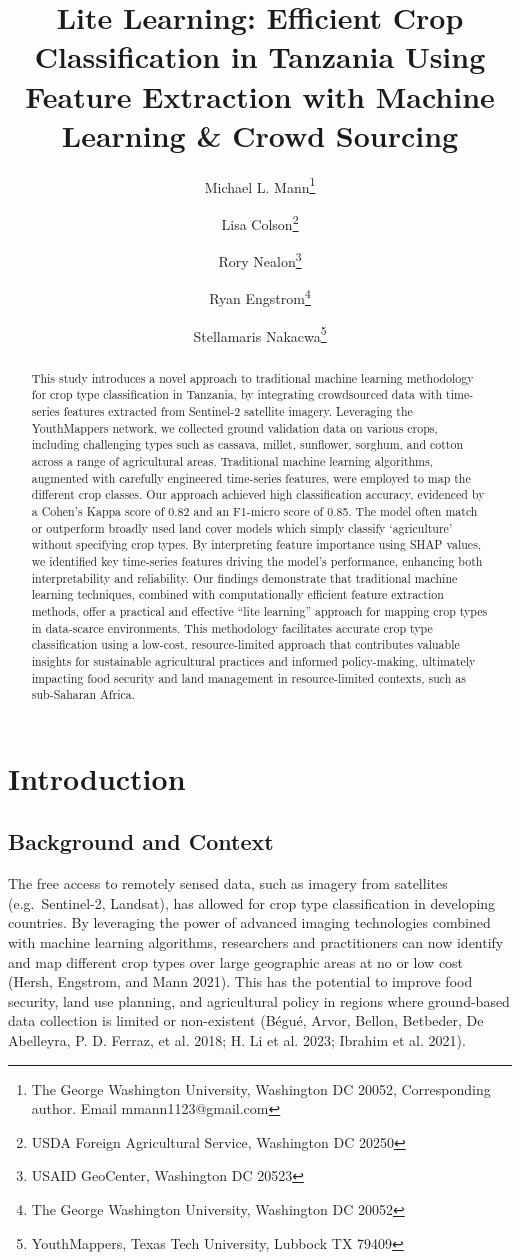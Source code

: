 \documentclass[
  journal,
  twocolumn]{IEEEtran}
\title{Lite Learning: Efficient Crop Classification in Tanzania Using
Feature Extraction with Machine Learning \& Crowd Sourcing}
\author{
Michael L. Mann\thanks{The George Washington University, Washington DC
20052, Corresponding author. Email mmann1123@gmail.com} \and 
Lisa Colson\thanks{USDA Foreign Agricultural Service, Washington DC
20250} \and 
Rory Nealon\thanks{USAID GeoCenter, Washington DC 20523} \and 
Ryan Engstrom\thanks{The George Washington University, Washington DC
20052} \and 
Stellamaris Nakacwa\thanks{YouthMappers, Texas Tech University, Lubbock
TX 79409}}
\date{}
\begin{document}
\maketitle
\begin{abstract}
This study introduces a novel approach to traditional machine learning
methodology for crop type classification in Tanzania, by integrating
crowdsourced data with time-series features extracted from Sentinel-2
satellite imagery. Leveraging the YouthMappers network, we collected
ground validation data on various crops, including challenging types
such as cassava, millet, sunflower, sorghum, and cotton across a range
of agricultural areas. Traditional machine learning algorithms,
augmented with carefully engineered time-series features, were employed
to map the different crop classes. Our approach achieved high
classification accuracy, evidenced by a Cohen's Kappa score of 0.82 and
an F1-micro score of 0.85. The model often match or outperform broadly
used land cover models which simply classify `agriculture' without
specifying crop types. By interpreting feature importance using SHAP
values, we identified key time-series features driving the model's
performance, enhancing both interpretability and reliability. Our
findings demonstrate that traditional machine learning techniques,
combined with computationally efficient feature extraction methods,
offer a practical and effective ``lite learning'' approach for mapping
crop types in data-scarce environments. This methodology facilitates
accurate crop type classification using a low-cost, resource-limited
approach that contributes valuable insights for sustainable agricultural
practices and informed policy-making, ultimately impacting food security
and land management in resource-limited contexts, such as sub-Saharan
Africa.
\end{abstract}

\hypertarget{introduction}{%
\section{Introduction}\label{introduction}}

\hypertarget{background-and-context}{%
\subsection{Background and Context}\label{background-and-context}}

The free access to remotely sensed data, such as imagery from satellites
(e.g.~Sentinel-2, Landsat), has allowed for crop type classification in
developing countries. By leveraging the power of advanced imaging
technologies combined with machine learning algorithms, researchers and
practitioners can now identify and map different crop types over large
geographic areas at no or low cost (Hersh, Engstrom, and Mann 2021).
This has the potential to improve food security, land use planning, and
agricultural policy in regions where ground-based data collection is
limited or non-existent (Bégué, Arvor, Bellon, Betbeder, De Abelleyra,
P. D. Ferraz, et al. 2018; H. Li et al. 2023; Ibrahim et al. 2021).
\end{document}
